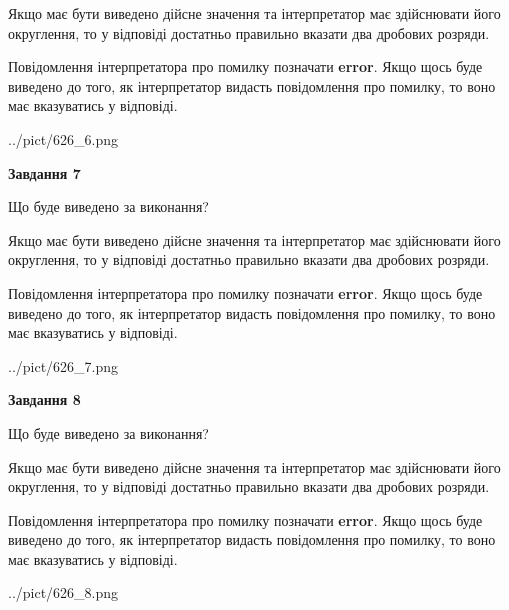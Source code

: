 \documentclass[12pt, ukrainian]{article}
\begin{document}
{\begin {Large}
Якщо має бути виведено дійсне значення та інтерпретатор має здійснювати його округлення, 
то у відповіді достатньо правильно вказати два дробових розряди.

Повідомлення інтерпретатора про помилку позначати \textbf{error}.
Якщо щось буде виведено до того, як інтерпретатор видасть повідомлення про помилку, 
то воно має вказуватись у відповіді. \par

\begin{center}
	{../pict/626_6.png}
\end{center}
\newpage

{\begin {center}\textbf{Завдання 7}\end {center}}\par
Що буде виведено за виконання? \par

Якщо має бути виведено дійсне значення та інтерпретатор має здійснювати його округлення, 
то у відповіді достатньо правильно вказати два дробових розряди.

Повідомлення інтерпретатора про помилку позначати \textbf{error}.
Якщо щось буде виведено до того, як інтерпретатор видасть повідомлення про помилку, 
то воно має вказуватись у відповіді. \par

\begin{center}
	{../pict/626_7.png}
\end{center}
\newpage

{\begin {center}\textbf{Завдання 8}\end {center}}\par
Що буде виведено за виконання? \par

Якщо має бути виведено дійсне значення та інтерпретатор має здійснювати його округлення, 
то у відповіді достатньо правильно вказати два дробових розряди.

Повідомлення інтерпретатора про помилку позначати \textbf{error}.
Якщо щось буде виведено до того, як інтерпретатор видасть повідомлення про помилку, 
то воно має вказуватись у відповіді. \par

\begin{center}
	{../pict/626_8.png}
\end{center}
\newpage


\end{Large}}
\end{document}
